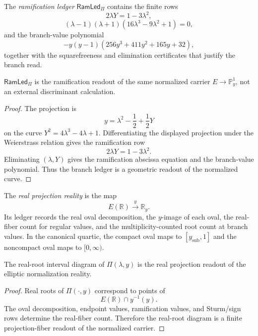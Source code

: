 \begin{definition}
\label{def:unified-reality-quartic-ramification-ledger}
The \emph{ramification ledger} $\mathsf{RamLed}_{\Pi}$ contains the
finite rows
$$
2\lambda Y=1-3\lambda^2,
$$
$$
(\lambda-1)(\lambda+1)(16\lambda^3-9\lambda^2+1)=0,
$$
and the branch-value polynomial
$$
-y(y-1)(256y^3+411y^2+165y+32),
$$
together with the squarefreeness and elimination certificates that
justify the branch read.
\end{definition}

\begin{theorem}
\label{thm:unified-reality-quartic-ramification-readout}
$\mathsf{RamLed}_{\Pi}$ is the ramification readout of the same
normalized carrier $E\to\mathbb P^1_y$, not an external discriminant
calculation.
\end{theorem}

\begin{proof}
The projection is
$$
y=\lambda^2-\frac12+\frac12Y
$$
on the curve $Y^2=4\lambda^3-4\lambda+1$. Differentiating the displayed
projection under the Weierstrass relation gives the ramification row
$$
2\lambda Y=1-3\lambda^2.
$$
Eliminating $(\lambda,Y)$ gives the ramification abscissa equation and
the branch-value polynomial. Thus the branch ledger is a geometric
readout of the normalized curve.
\end{proof}

\begin{definition}
\label{def:unified-reality-quartic-real-projection-reality}
The \emph{real projection reality} is the map
$$
E(\mathbb R)\xrightarrow{\,y\,}\mathbb R_y.
$$
Its ledger records the real oval decomposition, the $y$-image of each
oval, the real-fiber count for regular values, and the
multiplicity-counted root count at branch values. In the canonical
quartic, the compact oval maps to $[y_{\mathrm{sub}},1]$ and the
noncompact oval maps to $[0,\infty)$.
\end{definition}

\begin{theorem}
\label{thm:unified-reality-quartic-real-root-count-projection}
The real-root interval diagram of $\Pi(\lambda,y)$ is the real
projection readout of the elliptic normalization reality.
\end{theorem}

\begin{proof}
Real roots of $\Pi(\cdot,y)$ correspond to points of
$$
E(\mathbb R)\cap y^{-1}(y).
$$
The oval decomposition, endpoint values, ramification values, and
Sturm/sign rows determine the real-fiber count. Therefore the real-root
diagram is a finite projection-fiber readout of the normalized carrier.
\end{proof}

